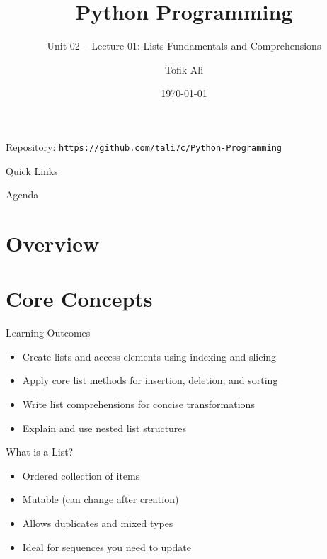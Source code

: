 \documentclass{beamer}
\title[Python Programming]{Python Programming}
\subtitle{Unit 02 -- Lecture 01: Lists Fundamentals and Comprehensions}
\author{Tofik Ali}
\institute{School of Computer Science, UPES Dehradun}
\date{\today}
\begin{document}
\begin{frame}[fragile]
  \titlepage
  \vspace{0.5em}
  \begin{center}
  \footnotesize Repository: \texttt{https://github.com/tali7c/Python-Programming}
  \end{center}
\end{frame}

\begin{frame}[fragile]{Quick Links}
  \centering
  \hyperlink{sec:core}{}\hspace{1em}
  \hyperlink{sec:demo}{}\hspace{1em}
  \hyperlink{sec:interactive}{}\hspace{1em}
  \hyperlink{sec:summary}{}
\end{frame}

\begin{frame}[fragile]{Agenda}
  \tableofcontents
\end{frame}

\section{Overview}

\section{Core Concepts}
\label{sec:core}

\begin{frame}[fragile]{Learning Outcomes}
  \begin{itemize}[<+->]
    \item Create lists and access elements using indexing and slicing
    \item Apply core list methods for insertion, deletion, and sorting
    \item Write list comprehensions for concise transformations
    \item Explain and use nested list structures
  \end{itemize}
\end{frame}

\begin{frame}[fragile]{What is a List?}
  \begin{itemize}[<+->]
    \item Ordered collection of items
    \item Mutable (can change after creation)
    \item Allows duplicates and mixed types
    \item Ideal for sequences you need to update
  \end{itemize}
\end{frame}
\end{document}

